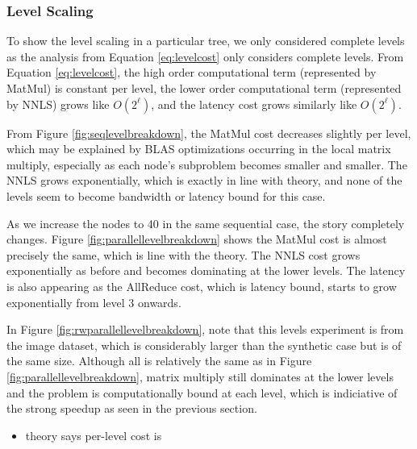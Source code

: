 \subsubsection{Level Scaling}


To show the level scaling in a particular tree, we only considered complete levels as the analysis from Equation \ref{eq:levelcost} only considers
complete levels. From Equation \ref{eq:levelcost}, the high order computational term (represented by MatMul) is constant per level, the lower order 
computational term (represented by NNLS) grows like $O(2^\ell)$, and the latency cost grows similarly like $O(2^\ell)$. 

From Figure \ref{fig:seqlevelbreakdown}, the MatMul cost decreases slightly per level, which may be explained by BLAS optimizations occurring in the
local matrix multiply, especially as each node's subproblem becomes smaller and smaller. The NNLS grows exponentially, which is exactly in line with theory,
and none of the levels seem to become bandwidth or latency bound for this case.

As we increase the nodes to 40 in the same sequential case, the story completely changes. Figure \ref{fig:parallellevelbreakdown} shows the MatMul cost is almost precisely the same, which is line with the theory.
The NNLS cost grows exponentially as before and becomes dominating at the lower levels. The latency is also appearing as the AllReduce cost, which is latency bound,
starts to grow exponentially from level 3 onwards. 

In Figure \ref{fig:rwparallellevelbreakdown}, note that this levels experiment is from the image dataset, which is considerably larger than the synthetic case but is of the same size.
Although all is relatively the same as in Figure \ref{fig:parallellevelbreakdown}, matrix multiply still dominates at the lower levels and the problem is computationally bound
at each level, which is indiciative of the strong speedup as seen in the previous section.

\begin{itemize}
	\item theory says per-level cost is 
\end{itemize}


